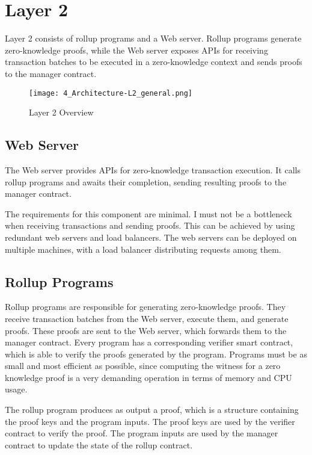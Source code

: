 \section{Layer 2\label{sec:designlayer2}}
Layer 2 consists of rollup programs and a Web server. Rollup programs generate zero-knowledge proofs, while the Web server exposes APIs for receiving transaction batches to be executed in a zero-knowledge context and sends proofs to the manager contract.

\begin{figure}[htb]
  \centering
  \texttt{[image: 4\_Architecture-L2\_general.png]}
  \caption{Layer 2 Overview}
  \label{fig:layer2overview}
\end{figure}

\subsection{Web Server\label{sec:designwebserver}}
The Web server provides APIs for zero-knowledge transaction execution. It calls rollup programs and awaits their completion, sending resulting proofs to the manager contract.

The requirements for this component are minimal. I must not be a bottleneck when receiving transactions and sending proofs. This can be achieved by using redundant web servers and load balancers. The web servers can be deployed on multiple machines, with a load balancer distributing requests among them.

\subsection{Rollup Programs\label{sec:designrollupprograms}}
Rollup programs are responsible for generating zero-knowledge proofs. They receive transaction batches from the Web server, execute them, and generate proofs. These proofs are sent to the Web server, which forwards them to the manager contract. Every program has a corresponding verifier smart contract, which is able to verify the proofs generated by the program. Programs must be as small and most efficient as possible, since computing the witness for a zero knowledge proof is a very demanding operation in terms of memory and CPU usage.

The rollup program produces as output a proof, which is a structure containing the proof keys and the program inputs. The proof keys are used by the verifier contract to verify the proof. The program inputs are used by the manager contract to update the state of the rollup contract.